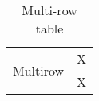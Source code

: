 \begin{table}[ht]
\caption{Multi-row table}
\begin{center}
\begin{tabular}{cc}
    \hline
    \multirow{2}{*}{Multirow}&X\\
    &X\\
    \hline
\end{tabular}
\end{center}
\label{tab:multicol}
\end{table}